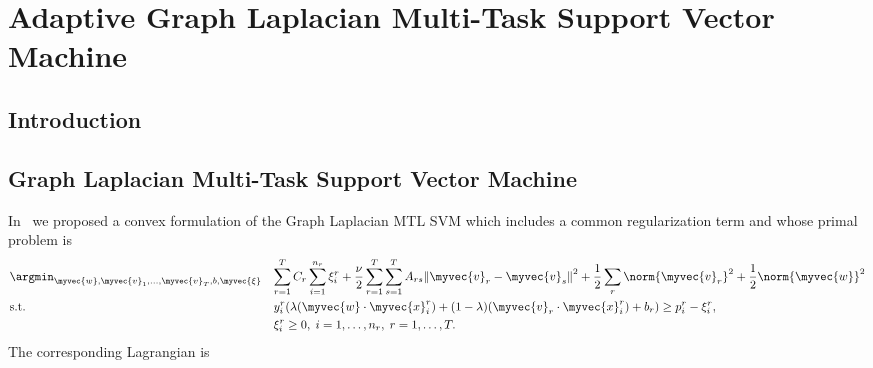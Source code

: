 
\chapter{Adaptive Graph Laplacian Multi-Task Support Vector Machine} %
\label{Chapter3}

{\bf \small{

}}

\section{Introduction}

\section{Graph Laplacian Multi-Task Support Vector Machine}
In~\cite{RuizAD20} we proposed a convex formulation of the Graph Laplacian MTL SVM which includes a common regularization term and whose primal problem is
%
\begin{equation}\label{eq:primal_cvx-graphLap}
  \begin{aligned}
  & \argmin_{\myvec{w}, \myvec{v}_1, \ldots, \myvec{v}_T, b , \myvec{\xi}}
  & & { \sum_{r=1}^T C_r \sum_{i=1}^{n_r} {\xi_i^r}  + \frac{\nu}{2} \sum_{r=1}^T \sum_{s=1}^T A_{rs} {\| \myvec{v}_r - \myvec{v}_s \|}^2 + \frac{1}{2} \sum_r \norm{\myvec{v}_r}^2 + \frac{1}{2} \norm{\myvec{w}}^2} \\
  & \text{s.t.}
  & & y_i^r (\lambda (\myvec{w} \cdot \myvec{x}_i^r) + (1 - \lambda) (\myvec{v}_r \cdot \myvec{x}_i^r) + b_r) \geq p_i^r - \xi_i^r  ,\\
  & & & \xi_i^r \geq 0,  \;  i = 1, \dotsc, n_r, \; r=1, \dotsc, T .
  \end{aligned}
\end{equation}
%
The corresponding Lagrangian is
